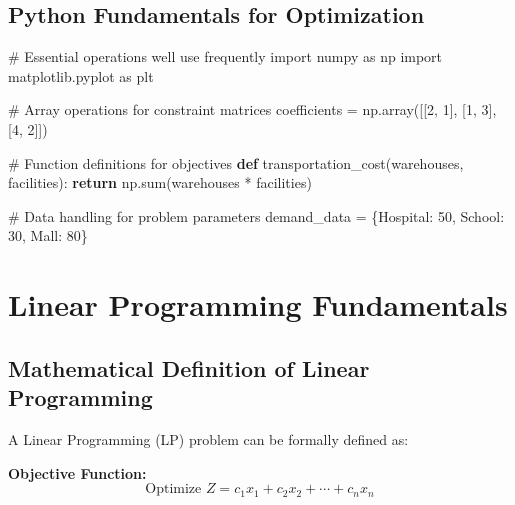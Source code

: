 \documentclass[
  letterpaper,
  DIV=11,
  numbers=noendperiod]{scrreprt}
\newenvironment{Shaded}{\begin{snugshade}}{\end{snugshade}}
\newcommand{\BuiltInTok}[1]{\textcolor[rgb]{0.00,0.23,0.31}{#1}}
\newcommand{\CommentTok}[1]{\textcolor[rgb]{0.37,0.37,0.37}{#1}}
\newcommand{\ControlFlowTok}[1]{\textcolor[rgb]{0.00,0.23,0.31}{\textbf{#1}}}
\newcommand{\DecValTok}[1]{\textcolor[rgb]{0.68,0.00,0.00}{#1}}
\newcommand{\ImportTok}[1]{\textcolor[rgb]{0.00,0.46,0.62}{#1}}
\newcommand{\KeywordTok}[1]{\textcolor[rgb]{0.00,0.23,0.31}{\textbf{#1}}}
\newcommand{\NormalTok}[1]{\textcolor[rgb]{0.00,0.23,0.31}{#1}}
\newcommand{\OperatorTok}[1]{\textcolor[rgb]{0.37,0.37,0.37}{#1}}
\newcommand{\StringTok}[1]{\textcolor[rgb]{0.13,0.47,0.30}{#1}}
\begin{document}
\subsection{Python Fundamentals for
Optimization}\label{python-fundamentals-for-optimization}

\begin{Shaded}
\begin{Highlighting}[]
\CommentTok{\# Essential operations we\textquotesingle{}ll use frequently}
\ImportTok{import}\NormalTok{ numpy }\ImportTok{as}\NormalTok{ np}
\ImportTok{import}\NormalTok{ matplotlib.pyplot }\ImportTok{as}\NormalTok{ plt}

\CommentTok{\# Array operations for constraint matrices}
\NormalTok{coefficients }\OperatorTok{=}\NormalTok{ np.array([[}\DecValTok{2}\NormalTok{, }\DecValTok{1}\NormalTok{], [}\DecValTok{1}\NormalTok{, }\DecValTok{3}\NormalTok{], [}\DecValTok{4}\NormalTok{, }\DecValTok{2}\NormalTok{]])}

\CommentTok{\# Function definitions for objectives}
\KeywordTok{def}\NormalTok{ transportation\_cost(warehouses, facilities):}
    \ControlFlowTok{return}\NormalTok{ np.}\BuiltInTok{sum}\NormalTok{(warehouses }\OperatorTok{*}\NormalTok{ facilities)}

\CommentTok{\# Data handling for problem parameters}
\NormalTok{demand\_data }\OperatorTok{=}\NormalTok{ \{}\StringTok{\textquotesingle{}Hospital\textquotesingle{}}\NormalTok{: }\DecValTok{50}\NormalTok{, }\StringTok{\textquotesingle{}School\textquotesingle{}}\NormalTok{: }\DecValTok{30}\NormalTok{, }\StringTok{\textquotesingle{}Mall\textquotesingle{}}\NormalTok{: }\DecValTok{80}\NormalTok{\}}
\end{Highlighting}
\end{Shaded}

\section{Linear Programming
Fundamentals}\label{linear-programming-fundamentals}

\subsection{Mathematical Definition of Linear
Programming}\label{mathematical-definition-of-linear-programming}

A Linear Programming (LP) problem can be formally defined as:

\textbf{Objective Function:} \[
\text{Optimize } Z = c_1x_1 + c_2x_2 + \cdots + c_nx_n
\]
\end{document}
